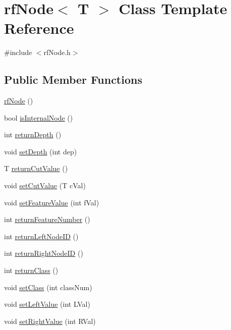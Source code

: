 \hypertarget{classrfNode}{}\section{rf\+Node$<$ T $>$ Class Template Reference}
\label{classrfNode}


{\ttfamily \#include $<$rf\+Node.\+h$>$}

\subsection*{Public Member Functions}
\begin{DoxyCompactItemize}
\item 
\hyperlink{classrfNode_afdc668c17dc9190635c088b54f251732}{rf\+Node} ()
\item 
bool \hyperlink{classrfNode_a1df9f7bc841c6df1ef5aa67a72c6d09c}{is\+Internal\+Node} ()
\item 
int \hyperlink{classrfNode_a0e95db0d0008bf347f53343cbcd5a38e}{return\+Depth} ()
\item 
void \hyperlink{classrfNode_a3de3a667502b31a45f90e92a7ae767e8}{set\+Depth} (int dep)
\item 
T \hyperlink{classrfNode_a8d51a6acaff3d3dca74881b55743884f}{return\+Cut\+Value} ()
\item 
void \hyperlink{classrfNode_aa37983f12ed98b25ff306313b93bb249}{set\+Cut\+Value} (T c\+Val)
\item 
void \hyperlink{classrfNode_a6a713bccdf5e59978075b0171bdaae73}{set\+Feature\+Value} (int f\+Val)
\item 
int \hyperlink{classrfNode_a060b06548e267392449252e14e9edab1}{return\+Feature\+Number} ()
\item 
int \hyperlink{classrfNode_a97148e8fd84a37471ab7ad5e7bdc12a4}{return\+Left\+Node\+ID} ()
\item 
int \hyperlink{classrfNode_aef5c965bd9810b3573057d611dcca7f5}{return\+Right\+Node\+ID} ()
\item 
int \hyperlink{classrfNode_aa43edab3527a456028116928e83b123d}{return\+Class} ()
\item 
void \hyperlink{classrfNode_a61c8f87f97999e0123a1f4655ffedd15}{set\+Class} (int class\+Num)
\item 
void \hyperlink{classrfNode_a959c72aff3d20ca0552d2369e7d88188}{set\+Left\+Value} (int L\+Val)
\item 
void \hyperlink{classrfNode_a473dc8da457727bc50dea408320e6993}{set\+Right\+Value} (int R\+Val)
\item 

\end{DoxyCompactItemize}
